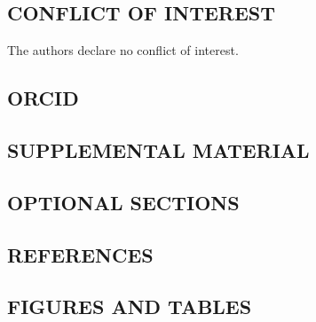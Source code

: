 \documentclass[
]{agujournal2019}
\begin{document}
\subsection{CONFLICT OF INTEREST}\label{conflict-of-interest}

The authors declare no conflict of interest.

\subsection{ORCID}\label{orcid}

\subsection{SUPPLEMENTAL MATERIAL}\label{supplemental-material}

\subsection{OPTIONAL SECTIONS}\label{optional-sections}

\subsection{REFERENCES}\label{references}

\subsection*{FIGURES AND TABLES}\label{figures-and-tables}
\end{document}
